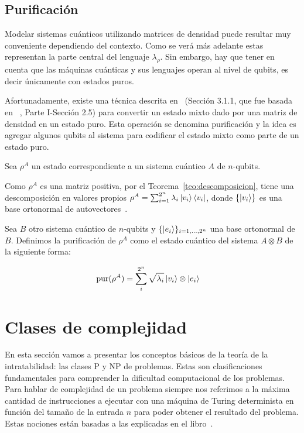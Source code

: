 \subsection{Purificación}
Modelar sistemas cuánticos utilizando matrices de densidad puede resultar muy conveniente dependiendo del contexto. Como se verá más adelante estas representan la parte central del lenguaje $\lambda_\rho$. Sin embargo, hay que tener en cuenta que las máquinas cuánticas y sus lenguajes operan al nivel de qubits, es decir únicamente con estados puros.

Afortunadamente, existe una técnica descrita en~\cite{agustin} (Sección 3.1.1, que fue basada en ~\cite{purification}, Parte I-Sección 2.5) para convertir un estado mixto dado por una matriz de densidad en un estado puro. Esta operación se denomina purificación y la idea es agregar algunos qubits al sistema para codificar el estado mixto como parte de un estado puro.




\begin{definicion}[Purificación]
\label{def:purificación}
Sea $\rho^A$ un estado correspondiente a un sistema cuántico $A$ de $n$-qubits.

Como $\rho^A$ es una matriz positiva, por el Teorema~\ref{teo:descomposicion}, tiene una descomposición en valores propios $\rho^A = \sum^{2^n}_{i=1} \lambda_i\ket{v_i}\bra{v_i}$, donde $\{\ket{v_i}\}$ es una base ortonormal de autovectores~\cite{algebra}.


Sea $B$ otro sistema cuántico de $n$-qubits y $\{\ket{e_i}\}_{i=1,\dots,2^n}$ una base ortonormal de $B$. Definimos la purificación de $\rho^A$ como el estado cuántico del sistema $A \otimes B$ de la siguiente forma:

\begin{align*}
\text{pur}(\rho^A) &= \sum_i^{2^n} \sqrt{\lambda_i}\ket{v_i}\otimes\ket{e_i}
\end{align*}

\end{definicion}

\section{Clases de complejidad}
En esta sección vamos a presentar los conceptos básicos de la teoría de la intratabilidad: las clases P y NP de problemas. Estas son clasificaciones fundamentales para comprender la dificultad computacional de los problemas. Para hablar de complejidad de un problema siempre nos referimos a la máxima cantidad de instrucciones a ejecutar con una máquina de Turing determinista en función del tamaño de la entrada $n$ para poder obtener el resultado del problema. Estas nociones están basadas a las explicadas en el libro~\cite{lenguajes}.

